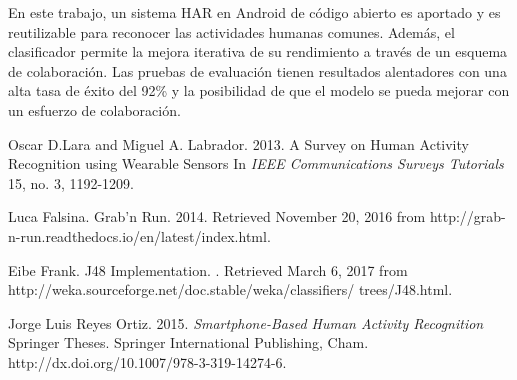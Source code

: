 \documentclass{sciposter}
\begin{document}
\begin{multicols}{3}
En este trabajo, un sistema HAR en Android de código abierto es aportado y es reutilizable para reconocer las actividades humanas comunes. Además, el clasificador permite la mejora iterativa de su rendimiento a través de un esquema de colaboración. Las pruebas de evaluación tienen resultados alentadores con una alta tasa de éxito del 92\% y la posibilidad de que el modelo se pueda mejorar con un esfuerzo de colaboración.
 



\begin{thebibliography}{1}

Oscar D.Lara and Miguel A. Labrador. 2013.
\newblock A Survey on Human Activity Recognition using Wearable Sensors
\newblock In \textit{IEEE Communications Surveys Tutorials} 15, no. 3, 1192-1209.

Luca Falsina. Grab’n Run. 2014.
\newblock Retrieved November 20, 2016 from
\newblock http://grab-n-run.readthedocs.io/en/latest/index.html.

Eibe Frank. J48 Implementation.
. Retrieved March 6, 2017 from
\newblock http://weka.sourceforge.net/doc.stable/weka/classifiers/
\newblock trees/J48.html.

Jorge Luis Reyes Ortiz. 2015. 
\newblock \textit{Smartphone-Based Human Activity Recognition}
\newblock Springer Theses. Springer International Publishing, Cham. 
\newblock http://dx.doi.org/10.1007/978-3-319-14274-6.

\end{thebibliography}

\end{multicols}
\end{document}
